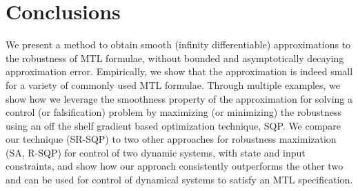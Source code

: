 \section{Conclusions}
We present a method to obtain smooth (infinity differentiable) approximations to the robustness of MTL formulae, without bounded and asymptotically decaying approximation error. Empirically, we show that the approximation is indeed small for a variety of commonly used MTL formulae. Through multiple examples, we show how we leverage the smoothness property of the approximation for solving a control (or falsification) problem by maximizing (or minimizing) the robustness using an off the shelf gradient based optimization technique, SQP. We compare our technique (SR-SQP) to two other approaches for robustness maximization (SA, R-SQP) for control of two dynamic systems, with state and input constraints, and show how our approach consistently outperforms the other two and can be used for control of dynamical systems to satisfy an MTL specification.

